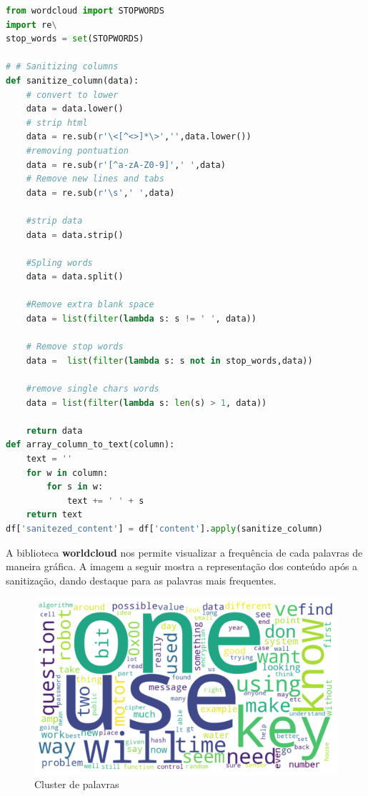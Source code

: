 \begin{lstlisting}[language=Python, caption=Sanitização do texto]
from wordcloud import STOPWORDS
import re\
stop_words = set(STOPWORDS)

# # Sanitizing columns
def sanitize_column(data):
    # convert to lower
    data = data.lower()
    # strip html
    data = re.sub(r'\<[^<>]*\>','',data.lower())
    #removing pontuation
    data = re.sub(r'[^a-zA-Z0-9]',' ',data)
    # Remove new lines and tabs
    data = re.sub(r'\s',' ',data)

    #strip data
    data = data.strip()

    #Spling words
    data = data.split()
    
    #Remove extra blank space
    data = list(filter(lambda s: s != ' ', data))

    # Remove stop words
    data =  list(filter(lambda s: s not in stop_words,data))

    #remove single chars words
    data = list(filter(lambda s: len(s) > 1, data))

    return data
def array_column_to_text(column):
    text = ''
    for w in column:
        for s in w:
            text += ' ' + s 
    return text
df['sanitezed_content'] = df['content'].apply(sanitize_column)
\end{lstlisting}

A biblioteca \textbf{worldcloud} nos permite visualizar a frequência de cada palavras de maneira gráfica.
A imagem a seguir mostra a representação dos conteúdo após a sanitização, dando destaque para as palavras mais frequentes.

 \begin{figure}[H]
   \centering
   \includegraphics[scale=0.50]{figs/wordcloud1.png}
    \caption{Cluster de palavras}
    \label{fig:wordcloud1}
 \end{figure}

